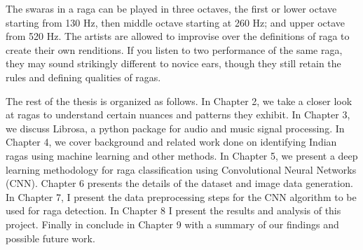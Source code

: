 The swaras in a raga can be played in three octaves, the first or lower octave starting from 130 Hz, then middle octave starting at 260 Hz; and upper octave from 520 Hz. The artists are allowed to improvise over the definitions of raga to create their own renditions. If you listen to two performance of the same raga, they may sound strikingly different to novice ears, though they still retain the rules and defining qualities of ragas. \par

The rest of the thesis is organized as follows. In Chapter 2, we take a closer look at ragas to understand certain nuances and patterns they exhibit. In Chapter 3, we discuss Librosa, a python package for audio and music signal processing. In Chapter 4, we cover background and related work done on identifying Indian ragas using machine learning and other methods. In Chapter 5, we present a deep learning methodology for raga classification using Convolutional Neural Networks (CNN). Chapter 6 presents the details of the dataset and image data generation. In Chapter 7, I present the data preprocessing steps for the CNN algorithm to be used for raga detection. In Chapter 8 I present the results and analysis of this project. Finally in conclude in Chapter 9 with a summary of our findings and possible future work. 
